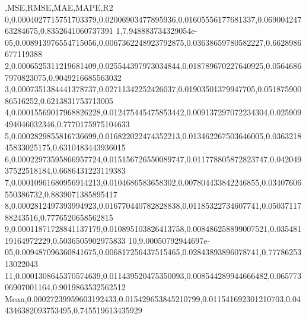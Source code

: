 ,MSE,RMSE,MAE,MAPE,R2
0,0.0004027715751703379,0.02006903477895936,0.01605556177681337,0.06900424763284675,0.8352641060737391
1,7.948883734329054e-05,0.008913976554715056,0.0067362248923792875,0.03638659780582227,0.6628986677119388
2,0.0006525311219681409,0.025544397973034844,0.018789670227640925,0.05646867970823075,0.9049216685563032
3,0.0007351384441378737,0.02711342252426037,0.01903501379947705,0.05187590086516252,0.6213831753713005
4,0.00015569017968826228,0.012475445475853442,0.009137297072234304,0.025909494046032346,0.7770175975104633
5,0.0002829855816736699,0.016822022474352213,0.013462267503646005,0.036321845833025175,0.6310483443936015
6,0.00022973595866957724,0.015156726550089747,0.011778805872823747,0.04204937522518184,0.6686431223119383
7,0.00010961680956914213,0.0104686583658302,0.007804433842246855,0.03407606550386732,0.8839071385895417
8,0.0002812497393994923,0.016770440782828838,0.01185322734607741,0.0503711788243516,0.7776520658562815
9,0.00011871728841137179,0.010895103826413758,0.008486258899007521,0.03548119164972229,0.5036505902975833
10,9.00050792944697e-05,0.009487096360841675,0.006817256437515465,0.02843893896078741,0.7778625313022043
11,0.0001308645370574639,0.011439520475350093,0.008544289944666482,0.06577306907001164,0.9019863532562512
Mean,0.00027239959603192433,0.015429653845210799,0.011541692301210703,0.044346382093753495,0.745519613435929
